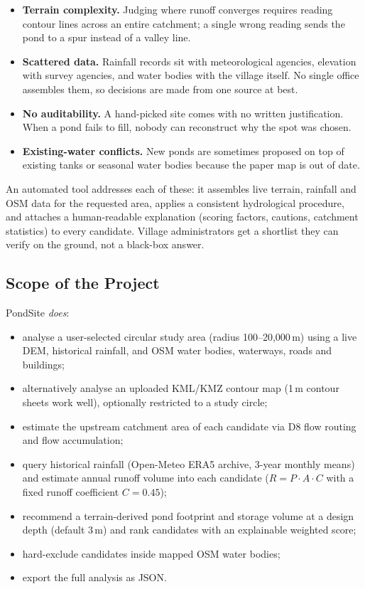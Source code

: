 \documentclass[manuscript,screen,review]{acmart}
\begin{document}
\begin{itemize}
  \item \textbf{Terrain complexity.} Judging where runoff converges requires
  reading contour lines across an entire catchment; a single wrong reading
  sends the pond to a spur instead of a valley line.
  \item \textbf{Scattered data.} Rainfall records sit with meteorological
  agencies, elevation with survey agencies, and water bodies with the village
  itself. No single office assembles them, so decisions are made from one
  source at best.
  \item \textbf{No auditability.} A hand-picked site comes with no written
  justification. When a pond fails to fill, nobody can reconstruct why the
  spot was chosen.
  \item \textbf{Existing-water conflicts.} New ponds are sometimes proposed
  on top of existing tanks or seasonal water bodies because the paper map
  is out of date.
\end{itemize}

An automated tool addresses each of these: it assembles live terrain,
rainfall and OSM data for the requested area, applies a consistent
hydrological procedure, and attaches a human-readable explanation (scoring
factors, cautions, catchment statistics) to every candidate. Village
administrators get a shortlist they can verify on the ground, not a black-box
answer.

\subsection{Scope of the Project}
PondSite \emph{does}:

\begin{itemize}
  \item analyse a user-selected circular study area (radius 100--20{,}000\,m)
  using a live DEM, historical rainfall, and OSM water bodies, waterways,
  roads and buildings;
  \item alternatively analyse an uploaded KML/KMZ contour map (1\,m contour
  sheets work well), optionally restricted to a study circle;
  \item estimate the upstream catchment area of each candidate via D8 flow
  routing and flow accumulation;
  \item query historical rainfall (Open-Meteo ERA5 archive, 3-year monthly
  means) and estimate annual runoff volume into each candidate
  ($R = P \cdot A \cdot C$ with a fixed runoff coefficient $C = 0.45$);
  \item recommend a terrain-derived pond footprint and storage volume at a
  design depth (default 3\,m) and rank candidates with an explainable
  weighted score;
  \item hard-exclude candidates inside mapped OSM water bodies;
  \item export the full analysis as JSON.
\end{itemize}
\end{document}
